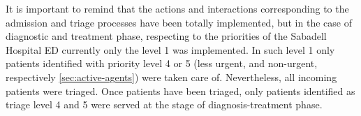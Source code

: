 It is important to remind that the actions and interactions corresponding
to the admission and triage processes have been totally implemented,
but in the case of diagnostic and treatment phase, respecting to the
priorities of the Sabadell Hospital ED currently only the level 1
was implemented. In such level 1 only patients identified with priority
level 4 or 5 (less urgent, and non-urgent, respectively \ref{sec:active-agents})
were taken care of. Nevertheless, all incoming patients were triaged.
Once patients have been triaged, only patients identified as triage
level 4 and 5 were served at the stage of diagnosis-treatment phase.

